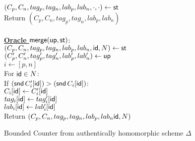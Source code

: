 \documentclass{article}
\begin{document}
\begin{figure}
{\begin{minipage}[t]{.44\linewidth}
	  $(C_p,C_n,tag_p,tag_n,lab_p,lab_n,\cdot,\cdot) \gets \mathsf{st}$\\
	  Return $(C_p,C_n,tag_p,tag_n,lab_p,lab_n)$\\
	  \\
       \underline{\bf Oracle $\mathsf{merge}(\mathsf{up},\mathsf{st})$}: \\
	  $(C_p,C_n,tag_p,tag_n,lab_p,lab_n,\mathsf{id},N) \gets \mathsf{st}$\\
	  $(C_p',C_n',tag_p',tag_n',lab_p',lab_n') \gets \mathsf{up}$\\
	  $i \gets [p,n]$\\
	  For $\mathsf{id} \in N$:\\
	  \phantom{x}If $(\mathsf{snd} \, C_i'[\mathsf{id}]) > (\mathsf{snd} \, C_i[\mathsf{id}])$: \\
	  \phantom{xx}$C_i[\mathsf{id}] \gets C_i'[\mathsf{id}]$\\
	  \phantom{xx}$tag_i[\mathsf{id}] \gets tag_i'[\mathsf{id}]$\\
	  \phantom{xx}$lab_i[\mathsf{id}] \gets lab_i'[\mathsf{id}]$\\
	  Return $(C_p,C_n,tag_p,tag_n,lab_p,lab_n\mathsf{id},N)$
     \end{minipage}
}
  \caption{Bounded Counter from authentically homomorphic scheme $\Delta$} 
  \label{fig.counterCRDT}
 \end{figure}
\end{document}
